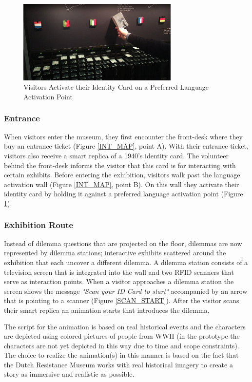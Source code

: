 \begin{figure} [h]
\includegraphics[width=8cm]{assets/lang_pass.jpg}
\caption{Visitors Activate their Identity Card on a Preferred Language Activation Point}
\centering
\label{LANG_PASS}
\end{figure}

\subsubsection{Entrance}
When visitors enter the museum, they first encounter the front-desk where they buy an entrance ticket (Figure \ref{INT_MAP}, point A). With their entrance ticket, visitors also receive a smart replica of a 1940's identity card. The volunteer behind the front-desk informs the visitor that this card is for interacting with certain exhibits. Before entering the exhibition, visitors walk past the language activation wall (Figure \ref{INT_MAP}, point B). On this wall they activate their identity card by holding it against a preferred language activation point (Figure \ref{LANG_PASS}).


\subsubsection{Exhibition Route} Instead of dilemma questions that are projected on the floor, dilemmas are now represented by dilemma stations; interactive exhibits scattered around the exhibition that each uncover a different dilemma. A dilemma station consists of a television screen that is integrated into the wall and two RFID scanners that serve as interaction points. When a visitor approaches a dilemma station the screen shows the message \textit{"Scan your ID Card to start"} accompanied by an arrow that is pointing to a scanner (Figure \ref{SCAN_START}). After the visitor scans their smart replica an animation starts that introduces the dilemma.

The script for the animation is based on real historical events and the characters are depicted using colored pictures of people from WWII (in the prototype the characters are not yet depicted in this way due to time and scope constraints). The choice to realize the animation(s) in this manner is based on the fact that the Dutch Resistance Museum works with real historical imagery to create a story as immersive and realistic as possible.

